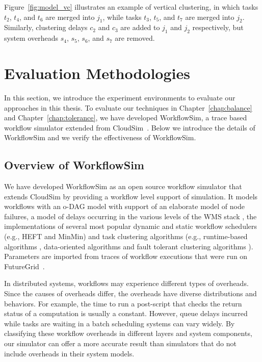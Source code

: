 Figure~\ref{fig:model_vc} illustrates an example of vertical clustering, in which tasks $t_2$, $t_4$, and $t_6$ are merged into $j_1$, while tasks $t_3$, $t_5$, and $t_7$ are merged into $j_2$. Similarly, clustering delays $c_2$ and $c_3$ are added to $j_1$ and $j_2$ respectively, but system overheads $s_4$, $s_5$, $s_6$, and $s_7$ are removed. 



\section{Evaluation Methodologies}
\label{sec:experiments}

In this section, we introduce the experiment environments to evaluate our approaches in this thesis. 
To evaluate our techniques in Chapter~\ref{chap:balance} and Chapter~\ref{chap:tolerance}, we have developed WorkflowSim, a trace based workflow simulator extended from CloudSim~\cite{Calheiros2011}. 
Below we introduce the details of WorkflowSim and we verify the effectiveness of WorkflowSim. 




\subsection{Overview of WorkflowSim}

We have developed WorkflowSim as an open source workflow simulator that extends CloudSim \cite{Calheiros2011} by providing a workflow level support of simulation. It models workflows with an o-DAG model with support of an elaborate model of node failures, a model of delays occurring in the various levels of the WMS stack \cite{Chen2011}, the implementations of several most popular dynamic and static workflow schedulers (e.g., HEFT\cite{Topcuoglu2002} and MinMin\cite{Blythe2005}) and task clustering algorithms (e.g., runtime-based algorithms \cite{Chen2013b}, data-oriented algorithms \cite{Chen2013b} and fault tolerant clustering algorithms \cite{Chen2012}). Parameters are imported from traces of workflow executions that were run on FutureGrid~\cite{Fox2013FutureGrid}. 

In distributed systems, workflows may experience different types of overheads.  Since the causes of overheads differ, the overheads have diverse distributions and behaviors. For example, the time to run a post-script that checks the return status of a computation is usually a constant. However, queue delays incurred while tasks are waiting in a batch scheduling systems can vary widely. 
By classifying these workflow overheads in different layers and system components, our simulator can offer a more accurate result than simulators that do not include overheads in their system models.

